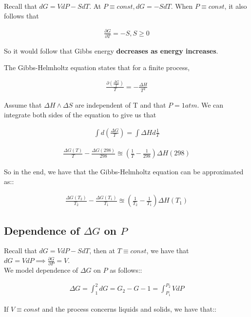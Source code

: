 \documentclass[12pt]{book}
\begin{document}
Recall that $dG=VdP-SdT$. At $P\equiv const,dG=-SdT$. When $P\equiv const$, it also follows that

\begin{align*}
    \frac{\partial G}{\partial T}=-S, S\geq 0
\end{align*}

So it would follow that Gibbs energy \textbf{decreases as energy increases}.

The Gibbs-Helmholtz equation states that for a finite process,

\begin{align*}
    \frac{\partial \left(\frac{\Delta G}{T}\right)}{T}=-\frac{\Delta H}{T^2}
\end{align*}

Assume that $\Delta H\land \Delta S$ are independent of T and that $P=1atm$. We can integrate both sides of the equation to give us that

\begin{align*}
    \int d\left(\frac{\Delta G}{T}\right)=\int\Delta Hd\frac{1}{T}
\end{align*}

\begin{align*}
    \frac{\Delta G(T)}{T}-\frac{\Delta G(298)}{298}\approxeq \left(\frac{1}{T}-\frac{1}{298}\right)\Delta H(298)
\end{align*}

So in the end, we have that the Gibbs-Helmholtz equation can be approximated as::

\begin{align*}
    \frac{\Delta G(T_2)}{T_2}-\frac{\Delta G(T_1)}{T_1}\approxeq \left(\frac{1}{T_2}-\frac{1}{T_1}\right)\Delta H(T_1)
\end{align*}

\subsection*{Dependence of $\Delta G$ on $P$}

Recall that $dG=VdP-SdT$, then at $T\equiv const$, we have that $dG=VdP\implies \frac{\partial G}{\partial P}=V$.\\

We model dependence of $\Delta G$ on $P$ as follows::

\begin{align*}
    \Delta G=\int_{1}^{2}dG=G_2-G-1=\int_{P_1}^{P_2}VdP
\end{align*}

If $V\equiv const$ and the process concerns liquids and solids, we have that::
\end{document}
